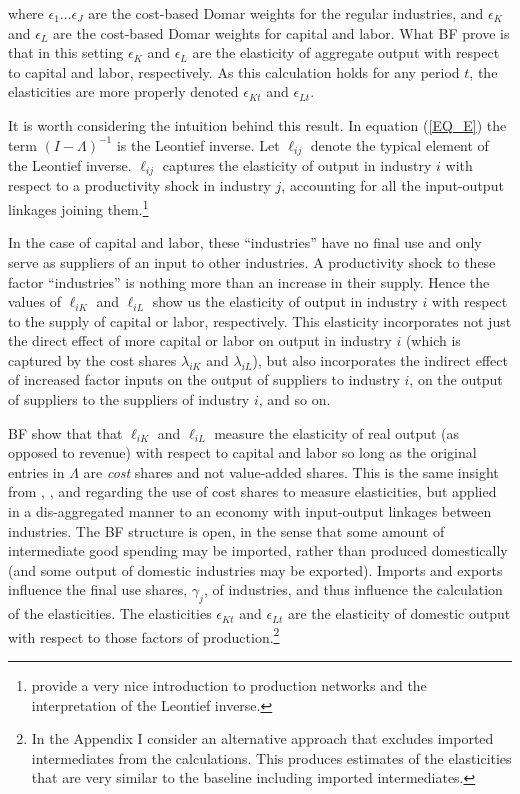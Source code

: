 \documentclass[11pt]{article}
\begin{document}
where $\epsilon_1 ... \epsilon_J$ are the cost-based Domar weights for the regular industries, and $\epsilon_K$ and $\epsilon_L$ are the cost-based Domar weights for capital and labor. What BF prove is that in this setting $\epsilon_K$ and $\epsilon_L$ are the elasticity of aggregate output with respect to capital and labor, respectively. As this calculation holds for any period $t$, the elasticities are more properly denoted $\epsilon_{Kt}$ and $\epsilon_{Lt}$.

It is worth considering the intuition behind this result. In equation (\ref{EQ_E}) the term $(I - \Lambda)^{-1}$ is the Leontief inverse. Let $\ell_{ij}$ denote the typical element of the Leontief inverse. $\ell_{ij}$ captures the elasticity of output in industry $i$ with respect to a productivity shock in industry $j$, accounting for all the input-output linkages joining them.\footnote{\cite{cts2018} provide a very nice introduction to production networks and the interpretation of the Leontief inverse.}

In the case of capital and labor, these ``industries'' have no final use and only serve as suppliers of an input to other industries. A productivity shock to these factor ``industries'' is nothing more than an increase in their supply. Hence the values of $\ell_{iK}$ and $\ell_{iL}$ show us the elasticity of output in industry $i$ with respect to the supply of capital or labor, respectively. This elasticity incorporates not just the direct effect of more capital or labor on output in industry $i$ (which is captured by the cost shares $\lambda_{iK}$ and $\lambda_{iL}$), but also incorporates the indirect effect of increased factor inputs on the output of suppliers to industry $i$, on the output of suppliers to the suppliers of industry $i$, and so on. 

BF show that that $\ell_{iK}$ and $\ell_{iL}$ measure the elasticity of real output (as opposed to revenue) with respect to capital and labor so long as the original entries in $\Lambda$ are \textit{cost} shares and not value-added shares. This is the same insight from \cite{hall1988,hall1990}, \cite{basufernald}, and \cite{fernaldneiman2011} regarding the use of cost shares to measure elasticities, but applied in a dis-aggregated manner to an economy with input-output linkages between industries. The BF structure is open, in the sense that some amount of intermediate good spending may be imported, rather than produced domestically (and some output of domestic industries may be exported). Imports and exports influence the final use shares, $\gamma_j$, of industries, and thus influence the calculation of the elasticities. The elasticities $\epsilon_{Kt}$ and $\epsilon_{Lt}$ are the elasticity of domestic output with respect to those factors of production.\footnote{In the Appendix I consider an alternative approach that excludes imported intermediates from the calculations. This produces estimates of the elasticities that are very similar to the baseline including imported intermediates.}
\end{document}
